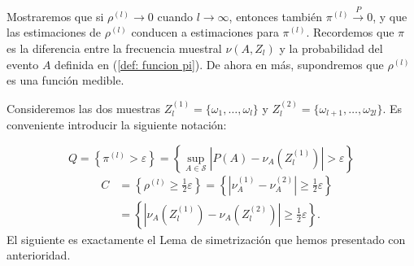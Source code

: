 \documentclass{report}
\begin{document}
Mostraremos que si \( \rho^{(l)} \to 0 \) cuando \( l \to \infty \), entonces también \( \pi^{(l)} \xrightarrow{P} 0 \),
y que las estimaciones de \( \rho^{(l)}\) conducen a estimaciones para \( \pi^{(l)} \). Recordemos que $\pi$ es la diferencia
entre la frecuencia muestral $\nu(A,Z_l)$ y la probabilidad del evento $A$ definida en (\ref{def: funcion pi}).
De ahora en más, supondremos que \( \rho^{(l)} \) es una función medible.

Consideremos las dos muestras $Z^{(1)}_l = \{\omega_1,\dots, \omega_l\}$ y $Z^{(2)}_l = \{\omega_{l+1},\dots, \omega_{2l}\}$.
Es conveniente introducir la siguiente notación:

\[
Q = \left\{ \pi^{(l)} > \varepsilon \right\} = \left\{ \sup_{A\in\mathcal{S}} |P(A)-\nu_A\left(Z^{(1)}_l\right)| > \varepsilon\right\}
\]
\[
\begin{aligned}
\quad C &= \left\{ \rho^{(l)} \geq \frac{1}{2}\varepsilon \right\}
       = \left\{ |\nu_A^{(1)} - \nu_A^{(2)}| \geq \frac{1}{2} \varepsilon\right\} \\
      &= \left\{ |\nu_A\left(Z^{(1)}_l\right) - \nu_A\left(Z^{(2)}_l\right)| \geq \frac{1}{2} \varepsilon\right\}.
\end{aligned}
\]
\bigbreak
El siguiente es exactamente el Lema de simetrización que hemos presentado con anterioridad.
\end{document}
